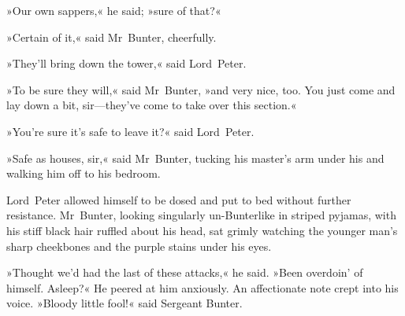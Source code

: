 »Our own sappers,« he said; »sure of that?«

»Certain of it,« said Mr~Bunter, cheerfully.

»They'll bring down the tower,« said Lord~Peter.

»To be sure they will,« said Mr~Bunter, »and very nice, too. You just come and lay down a bit, sir—they've come to take over this section.«

»You're sure it's safe to leave it?« said Lord~Peter.

»Safe as houses, sir,« said Mr~Bunter, tucking his master's arm under his and walking him off to his bedroom.

Lord~Peter allowed himself to be dosed and put to bed without further resistance. Mr~Bunter, looking singularly un-Bunterlike in striped pyjamas, with his stiff black hair ruffled about his head, sat grimly watching the younger man's sharp cheekbones and the purple stains under his eyes.

»Thought we'd had the last of these attacks,« he said. »Been overdoin' of himself. Asleep?« He peered at him anxiously. An affectionate note crept into his voice. »Bloody little fool!« said Sergeant Bunter.